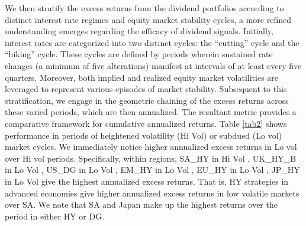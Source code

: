 \documentclass[10pt,preprint, authoryear]{elsarticle}
\numberwithin{equation}{section}
\numberwithin{figure}{section}
\numberwithin{table}{section}
\begin{document}
We then stratify the excess returns from the dividend portfolios
according to distinct interest rate regimes and equity market stability
cycles, a more refined understanding emerges regarding the efficacy of
dividend signals. Initially, interest rates are categorized into two
distinct cycles: the ``cutting'' cycle and the ``hiking'' cycle. These
cycles are defined by periods wherein sustained rate changes (a minimum
of five alterations) manifest at intervals of at least every five
quarters. Moreover, both implied and realized equity market volatilities
are leveraged to represent various episodes of market stability.
Subsequent to this stratification, we engage in the geometric chaining
of the excess returns across these varied periods, which are then
annualized. The resultant metric provides a comparative framework for
cumulative annualized returns. Table \ref{tab2} shows performance in
periods of heightened volatility (Hi Vol) or subdued (Lo vol) market
cycles. We immediately notice higher annualized excess returns in Lo vol
over Hi vol periods. Specifically, within regions, SA\_HY in Hi Vol ,
UK\_HY\_B in Lo Vol , US\_DG in Lo Vol , EM\_HY in Lo Vol , EU\_HY in Lo
Vol , JP\_HY in Lo Vol give the highest annualized excess returns. That
is, HY strategies in advanced economies give higher annualized excess
returns in low volatile markets over SA. We note that SA and Japan make
up the highest returns over the period in either HY or DG.
\end{document}
